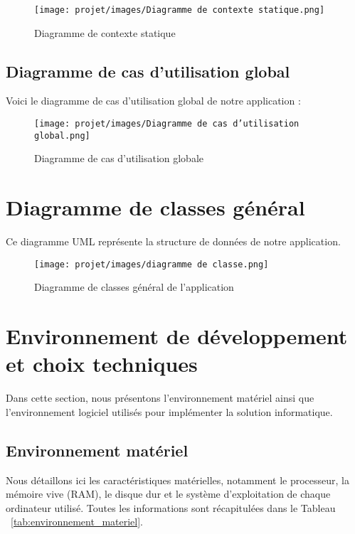 \begin{figure}[H]
    \centering
    \texttt{[image: projet/images/Diagramme de contexte statique.png]}
    \caption{Diagramme de contexte statique}
\end{figure}

\subsection{Diagramme de cas d’utilisation global}
Voici le diagramme de cas d’utilisation global de notre application :

\begin{figure}[H]
    \centering
    \texttt{[image: projet/images/Diagramme de cas d’utilisation global.png]}
    \caption{Diagramme de cas d'utilisation globale}
\end{figure}

\section{Diagramme de classes général}

Ce diagramme UML représente la structure de données de notre application.

\begin{figure}[H]
    \centering
    \texttt{[image: projet/images/diagramme de classe.png]}
    \caption{Diagramme de classes général de l'application}
    \label{fig:diagramme_classe}
\end{figure}

\section{Environnement de développement et choix techniques}

Dans cette section, nous présentons l’environnement matériel ainsi que l’environnement logiciel utilisés pour implémenter la solution informatique.

\subsection{Environnement matériel}

Nous détaillons ici les caractéristiques matérielles, notamment le processeur, la mémoire vive (RAM), le disque dur et le système d’exploitation de chaque ordinateur utilisé. Toutes les informations sont récapitulées dans le Tableau ~\ref{tab:environnement_materiel}.

